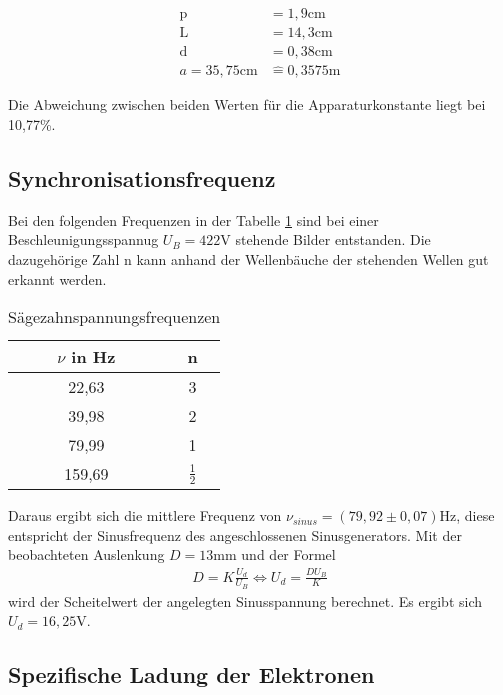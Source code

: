 \begin{align*}
  \text{p} &= 1,9 \text{cm} \\
  \text{L} &= 14,3 \text{cm} \\
  \text{d} &= 0,38 \text{cm} \\
  a = 35,75 \text{cm}	&\widehat{=} 0,3575 \text{m}
\end{align*}
\noindent 

Die Abweichung zwischen beiden Werten für die Apparaturkonstante liegt bei 10,77\%.

\subsection{Synchronisationsfrequenz}
\label{synchro}

Bei den folgenden Frequenzen in der Tabelle \ref{tab:messwerte4} sind bei einer Beschleunigungsspannug $U_B = 422$V stehende Bilder entstanden.
Die dazugehörige Zahl n kann anhand der Wellenbäuche der stehenden Wellen gut erkannt werden.

\FloatBarrier
\begin{table}
  \centering
  \caption{Sägezahnspannungsfrequenzen}
  \label{tab:messwerte4}
  \begin{tabular}{c c}
  \toprule
   $\nu$ in Hz & n \\
  \midrule
  22,63 & 3 \\
  39,98 & 2 \\
  79,99  & 1 \\
  159,69 & $\frac{1}{2}$ \\
  \bottomrule
  \bottomrule
\end{tabular}
\end{table}
\noindent 

Daraus ergibt sich die mittlere Frequenz von $\nu_{sinus} = (79,92 \pm 0,07) \text{Hz}$, diese entspricht der Sinusfrequenz des angeschlossenen Sinusgenerators.
Mit der beobachteten Auslenkung $D = 13$mm und der Formel
\begin{align*}
  D = K \frac{U_d}{U_B} \Leftrightarrow U_d = \frac{D U_B}{K}
\end{align*}
\noindent 
wird der Scheitelwert der angelegten Sinusspannung berechnet.
Es ergibt sich $U_d = 16,25$V.


\subsection{Spezifische Ladung der Elektronen}
\label{spezLadung}

